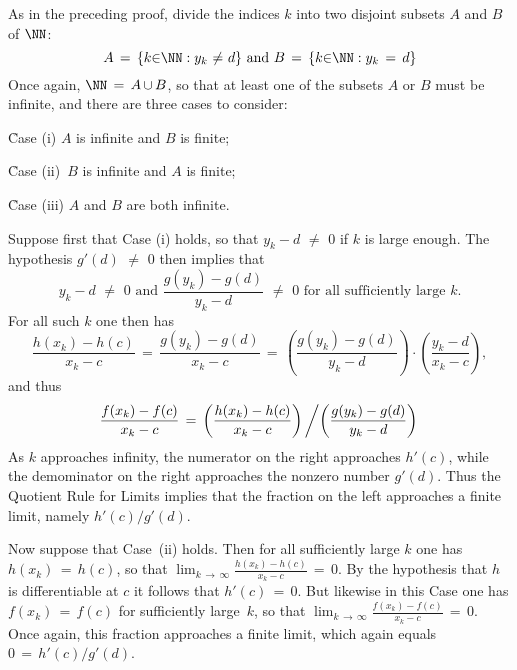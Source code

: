         As in the preceding proof, divide the indices $k$ into two disjoint subsets $A$ and $B$ of ${\NN}$:
        \begin{displaymath}
        A \,=\, \{k{\in}{\NN}: y_{k} \,\,{\neq}\,\, d\} \mbox{ and }
        B \,=\, \{k{\in}{\NN}: y_{k} \,=\, d\}
        \end{displaymath}
    Once again, ${\NN} \,=\, A\,{\cup}\,B$, so that at least one of the subsets $A$ or $B$ must be infinite, and there are three cases to consider:

\VA

        \h Case (i)\,\,$A$ is infinite and $B$ is finite;

        \h Case (ii)\, $B$ is infinite and $A$ is finite;

        \h Case (iii) $A$ and $B$ are both infinite.

\VA

        Suppose first that Case (i) holds, so that $y_{k}-d \,\,{\neq}\,\, 0$ if $k$ is large enough. The hypothesis $g'(d) \,\,{\neq}\,\, 0$ then implies that
        \begin{displaymath}
        y_{k}-d \,\,{\neq}\,\, 0 \mbox{ and }
        \frac{g(y_{k}) - g(d)}{y_{k}-d} \,\,{\neq}\,\, 0 \mbox{ for all sufficiently large $k$}.
        \end{displaymath}
    For all such $k$ one then has
        \begin{displaymath}
        \frac{h(x_{k}) - h(c)}{x_{k} -c} \,=\, \frac{g(y_{k}) - g(d)}{x_{k} - c}
     \,=\, 
        \left(\frac{g(y_{k}) - g(d)}{y_{k} - d}\right){\cdot}\left(\frac{y_{k} - d}{x_{k}-c}\right),
        \end{displaymath}
    and thus
        \begin{displaymath}
        \frac{f(x_{k}) - f(c)}{x_{k} - c}
     \,=\, 
        \left(\frac{h(x_{k}) - h(c)}{x_{k} - c}\right)\left/\left(\frac{g(y_{k}) - g(d)}{y_{k}-d}\right)\right.
        \end{displaymath}
    As $k$ approaches infinity, the numerator on the right approaches $h'(c)$, while the demominator on the right approaches the nonzero number $g'(d)$.
    Thus the Quotient Rule for Limits implies that the fraction on the left approaches a finite limit, namely $h'(c)/g'(d)$.

        Now suppose that Case~(ii) holds. Then for all sufficiently large $k$ one has $h(x_{k}) \,=\, h(c)$,
    so that ${\displaystyle \lim_{k \,{\rightarrow}\, {\infty}} \frac{h(x_{k}) - h(c)}{x_{k}-c} \,=\, 0}$.
    By the hypothesis that $h$ is differentiable at $c$ it follows that $h'(c) \,=\, 0$.
    But likewise in this Case one has $f(x_{k}) \,=\, f(c)$ for sufficiently large~$k$, so that ${\displaystyle \lim_{k \,{\rightarrow}\, {\infty}} \frac{f(x_{k})-f(c)}{x_{k}-c} \,=\, 0}$. Once again, this fraction approaches a finite limit, which again equals $0 \,=\, h'(c)/g'(d)$.

